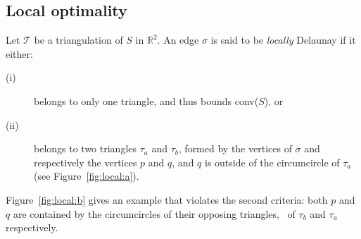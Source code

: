 \subsection{Local optimality}
Let $\mathcal{T}$ be a triangulation of $S$ in $\mathbb{R}^2$. 
An edge $\sigma$ is said to be \emph{locally} Delaunay if it either:
\begin{description}
  \item[(i)] belongs to only one triangle, and thus bounds conv($S$), or
  \item[(ii)] belongs to two triangles $\tau_a$ and $\tau_b$, formed by the vertices of $\sigma$ and respectively the vertices $p$ and $q$, and $q$ is outside of the circumcircle of $\tau_a$ (see Figure~\ref{fig:local:a}). 
\end{description}
Figure~\ref{fig:local:b} gives an example that violates the second criteria: both $p$ and $q$ are contained by the circumcircles of their opposing triangles, \ie\ of $\tau_b$ and $\tau_a$ respectively.
